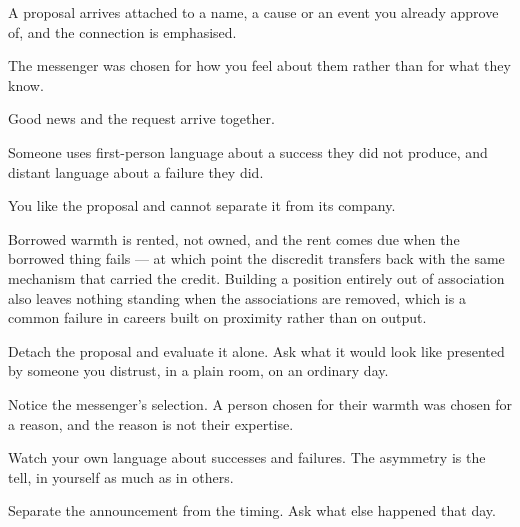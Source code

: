\begin{feedback}
  \item A proposal arrives attached to a name, a cause or an event you already approve of, and the connection is emphasised.
  \item The messenger was chosen for how you feel about them rather than for what they know.
  \item Good news and the request arrive together.
  \item Someone uses first-person language about a success they did not produce, and distant language about a failure they did.
  \item You like the proposal and cannot separate it from its company.
\end{feedback}

\begin{failure}
Borrowed warmth is rented, not owned, and the rent comes due when the borrowed thing fails --- at which point the discredit transfers back with the same mechanism that carried the credit. Building a position entirely out of association also leaves nothing standing when the associations are removed, which is a common failure in careers built on proximity rather than on output.
\end{failure}

\begin{countermeasures}
  \item Detach the proposal and evaluate it alone. Ask what it would look like presented by someone you distrust, in a plain room, on an ordinary day.
  \item Notice the messenger's selection. A person chosen for their warmth was chosen for a reason, and the reason is not their expertise.
  \item Watch your own language about successes and failures. The asymmetry is the tell, in yourself as much as in others.
  \item Separate the announcement from the timing. Ask what else happened that day.
\end{countermeasures}

\seesources
{}
